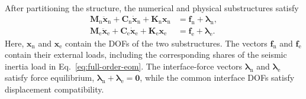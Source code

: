 \documentclass[11pt]{article}
\begin{document}
After partitioning the structure, the numerical and physical substructures satisfy
\begin{subequations}
\label{eq:substructure-eom}
\begin{align}
    \mathbf{M}_{\mathrm{n}}\ddot{\bm{x}}_{\mathrm{n}}
    +\mathbf{C}_{\mathrm{n}}\dot{\bm{x}}_{\mathrm{n}}
    +\mathbf{K}_{\mathrm{n}}\bm{x}_{\mathrm{n}}
    &=\bm{f}_{\mathrm{n}}+\bm{\lambda}_{\mathrm{n}},
    \label{eq:numerical-eom}\\
    \mathbf{M}_{\mathrm{e}}\ddot{\bm{x}}_{\mathrm{e}}
    +\mathbf{C}_{\mathrm{e}}\dot{\bm{x}}_{\mathrm{e}}
    +\mathbf{K}_{\mathrm{e}}\bm{x}_{\mathrm{e}}
    &=\bm{f}_{\mathrm{e}}+\bm{\lambda}_{\mathrm{e}}.
    \label{eq:physical-eom}
\end{align}
\end{subequations}
Here, \(\bm{x}_{\mathrm{n}}\) and \(\bm{x}_{\mathrm{e}}\) contain the DOFs of the two substructures. The vectors \(\bm{f}_{\mathrm{n}}\) and \(\bm{f}_{\mathrm{e}}\) contain their external loads, including the corresponding shares of the seismic inertia load in Eq.~\eqref{eq:full-order-eom}. The interface-force vectors \(\bm{\lambda}_{\mathrm{n}}\) and \(\bm{\lambda}_{\mathrm{e}}\) satisfy force equilibrium, \(\bm{\lambda}_{\mathrm{n}}+\bm{\lambda}_{\mathrm{e}}=\bm{0}\), while the common interface DOFs satisfy displacement compatibility.
\end{document}
